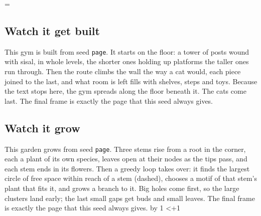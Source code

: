 \documentclass[11pt,a4paper]{article}
\begin{document}
\animk=\animfrom\relax
\loop
  \setcounter{page}{1}\setcounter{section}{3}\setcounter{subsection}{2}
  \florilegiumframe[\animexplain]{\the\animk}{\animframes}
  \ifdefined\animtheme
  \subsection{Watch it get built}

  This gym is built from seed \texttt{\ifx\florilegiumseed\empty page\else\florilegiumseed\fi}.
  It starts on the floor: a tower of posts wound with sisal, in whole levels, the shorter ones
  holding up platforms the taller ones run through. Then the route climbs the wall the way a
  cat would, each piece joined to the last, and what room is left fills with shelves, steps and
  toys. Because the text stops here, the gym spreads along the floor beneath it. The cats come
  last. The final frame is exactly the page that this seed always gives.
  \else
  \subsection{Watch it grow}

  This garden grows from seed \texttt{\ifx\florilegiumseed\empty page\else\florilegiumseed\fi}.
  Three stems rise from a root in the corner, each a plant of its own species, leaves open
  at their nodes as the tips pass, and each stem ends in its flowers. Then a greedy loop
  takes over: it finds the largest circle of free space within reach of a stem\ifx\animexplain\empty\else{} (dashed)\fi,
  chooses a motif of that stem's plant that fits it, and grows a branch to it. Big holes
  come first, so the large clusters land early; the last small gaps get buds and small
  leaves. The final frame is exactly the page that this seed always gives.
  \fi
  \florilegiumtextend
  \clearpage
  \advance\animk by 1
\ifnum\animk<\numexpr\animto+1\relax\repeat
\end{document}
